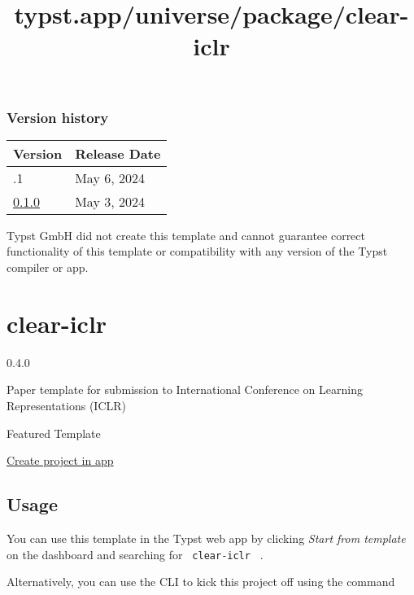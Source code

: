 \label{versions}
\subsubsection{Version history}\label{version-history}

\begin{longtable}[]{@{}ll@{}}
\toprule\noalign{}
Version & Release Date \\
\midrule\noalign{}
\endhead
\bottomrule\noalign{}
\endlastfoot
0.1.1 & May 6, 2024 \\
\href{https://typst.app/universe/package/ttuile/0.1.0/}{0.1.0} & May 3,
2024 \\
\end{longtable}

Typst GmbH did not create this template and cannot guarantee correct
functionality of this template or compatibility with any version of the
Typst compiler or app.


\title{typst.app/universe/package/clear-iclr}

\label{banner}
\label{template-thumbnail}

\section{clear-iclr}\label{clear-iclr}

{ 0.4.0 }

Paper template for submission to International Conference on Learning
Representations (ICLR)

{ } Featured Template

\href{/app?template=clear-iclr&version=0.4.0}{Create project in app}

\label{readme}
\subsection{Usage}\label{usage}

You can use this template in the Typst web app by clicking \emph{Start
from template} on the dashboard and searching for
\texttt{\ clear-iclr\ } .

Alternatively, you can use the CLI to kick this project off using the
command

\begin{Shaded}
\begin{Highlighting}[]
\end{Highlighting}
\end{Shaded}

